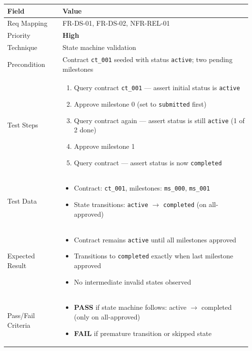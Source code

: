 \documentclass[12pt,a4paper]{article}
\newcommand{\sevhigh}{\textcolor{severityhigh}{\textbf{High}}}
\newcommand{\passresult}{\textcolor{passgreen}{\textbf{PASS}}}
\newcommand{\failresult}{\textcolor{failred}{\textbf{FAIL}}}
\begin{document}
\begin{tabular}{|p{}|p{}|}
\hline
\rowcolor{lightblue} \textbf{Field} & \textbf{Value} \\
\hline
Req Mapping & FR-DS-01, FR-DS-02, NFR-REL-01 \\
\hline
Priority & \sevhigh \\
\hline
Technique & State machine validation \\
\hline
Precondition & Contract \texttt{ct\_001} seeded with status \texttt{active}; two pending milestones \\
\hline
Test Steps &
\begin{enumerate}[nosep, leftmargin=*]
  \item Query contract \texttt{ct\_001} --- assert initial status is \texttt{active}
  \item Approve milestone 0 (set to \texttt{submitted} first)
  \item Query contract again --- assert status is still \texttt{active} (1 of 2 done)
  \item Approve milestone 1
  \item Query contract --- assert status is now \texttt{completed}
\end{enumerate} \\
\hline
Test Data &
\begin{itemize}[nosep, leftmargin=*]
  \item Contract: \texttt{ct\_001}, milestones: \texttt{ms\_000}, \texttt{ms\_001}
  \item State transitions: \texttt{active} $\rightarrow$ \texttt{completed} (on all-approved)
\end{itemize} \\
\hline
Expected Result &
\begin{itemize}[nosep, leftmargin=*]
  \item Contract remains \texttt{active} until all milestones approved
  \item Transitions to \texttt{completed} exactly when last milestone approved
  \item No intermediate invalid states observed
\end{itemize} \\
\hline
Pass/Fail Criteria &
\begin{itemize}[nosep, leftmargin=*]
  \item \passresult{} if state machine follows: active $\rightarrow$ completed (only on all-approved)
  \item \failresult{} if premature transition or skipped state
\end{itemize} \\
\hline
\end{tabular}
\end{document}

